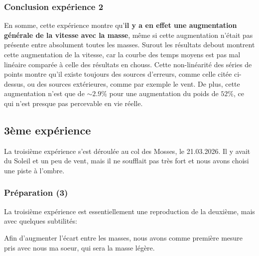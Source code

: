 \documentclass{article}
\begin{document}
\subsubsection{Conclusion expérience 2}

En somme, cette expérience montre qu'\textbf{il y a en effet une augmentation générale de la vitesse avec la masse}, même si cette augmentation n'était pas présente entre absolument toutes les masses. Surout les résultats debout montrent cette augmentation de la vitesse, car la courbe des temps moyens est pas mal linéaire comparée à celle des résultats en chouss. Cette non-linéarité des séries de points montre qu'il existe toujours des sources d'erreurs, comme celle citée ci-dessus, ou des sources extérieures, comme par exemple le vent. De plus, cette augmentation n'est que de $\sim 2.9\%$ pour une augmentation du poids de $52\%$, ce qui n'est presque pas percevable en vie réelle.   
\subsection{3ème expérience}

La troisième expérience s'est déroulée au col des Mosses, le 21.03.2026. Il y avait du Soleil et un peu de vent, mais il ne soufflait pas très fort et nous avons choisi une piste à l'ombre.

\subsubsection{Préparation (3)}

La troisième expérience est essentiellement une reproduction de la deuxième, mais avec quelques subtilités:

\vspace{0.3cm}

Afin d'augmenter l'écart entre les masses, nous avons comme première mesure pris avec nous ma soeur, qui sera la masse légère.
\end{document}
